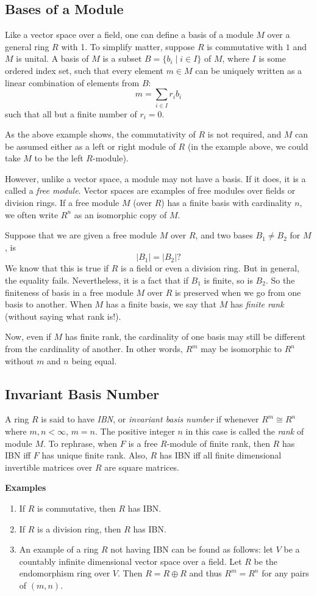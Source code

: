 \documentclass[12pt]{article}
\begin{document}
\subsection*{Bases of a Module}
Like a vector space over a field, one can define a basis of a module $M$ over a general ring $R$ with 1.  To simplify matter, suppose $R$ is commutative with $1$ and $M$ is unital.  A basis of $M$ is a subset $B=\lbrace b_i\mid i\in I\rbrace$ of $M$, where $I$ is some ordered index set, such that every element $m\in M$ can be uniquely written as a linear combination of elements from $B$:
$$m=\sum_{i\in I}r_ib_i$$
such that all but a finite number of $r_i=0$.

As the above example shows, the commutativity of $R$ is not required, and $M$ can be assumed either as a left or right module of $R$ (in the example above, we could take $M$ to be the left $R$-module).

However, unlike a vector space, a module may not have a basis.  If it does, it is a called a \emph{free module}.  Vector spaces are examples of free modules over fields or division rings.  If a free module $M$ (over $R$) has a finite basis with cardinality $n$, we often write $R^n$ as an isomorphic copy of $M$.

Suppose that we are given a free module $M$ over $R$, and two bases $B_1\neq B_2$ for $M$, is $$|B_1| = |B_2|?$$  We know that this is true if $R$ is a field or even a division ring.  But in general, the equality fails.  Nevertheless, it is a fact that if $B_1$ is finite, so is $B_2$.  So the finiteness of basis in a free module $M$ over $R$ is preserved when we go from one basis to another.  When $M$ has a finite basis, we say that $M$ has \emph{finite rank} (without saying what rank is!).  

Now, even if $M$ has finite rank, the cardinality of one basis may still be different from the cardinality of another.  In other words, $R^m$ may be isomorphic to $R^n$ without $m$ and $n$ being equal.

\subsection*{Invariant Basis Number}
A ring $R$ is said to have \emph{IBN}, or \emph{invariant basis number} if whenever $R^m \cong R^n$ where $m,n<\infty$, $m=n$.  The positive integer $n$ in this case is called the \emph{rank} of module $M$.  To rephrase, when $F$ is a free $R$-module of finite rank, then $R$ has IBN iff $F$ has unique finite rank.  Also, $R$ has IBN iff all finite dimensional invertible matrices over $R$ are square matrices.

\textbf{Examples}
\begin{enumerate}
\item If $R$ is commutative, then $R$ has IBN.
\item If $R$ is a division ring, then $R$ has IBN.
\item An example of a ring $R$ not having IBN can be found as follows: let $V$ be a countably infinite dimensional vector space over a field.  Let $R$ be the endomorphism ring over $V$.  Then $R=R\oplus R$ and thus $R^m=R^n$ for any pairs of $(m,n)$.
\end{enumerate}
\end{document}
